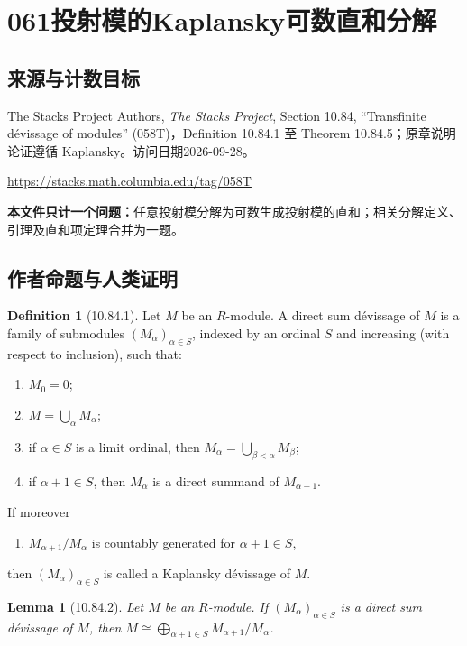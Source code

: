 \documentclass[UTF8,11pt]{ctexart}
\newtheorem*{lemma}{Lemma}
\theoremstyle{definition}
\newtheorem*{definition}{Definition}
\begin{document}
\section*{061\quad 投射模的Kaplansky可数直和分解}
\subsection*{来源与计数目标}
The Stacks Project Authors, \emph{The Stacks Project}, Section 10.84, ``Transfinite d\'evissage of modules'' (058T)，Definition 10.84.1 至 Theorem 10.84.5；原章说明论证遵循 Kaplansky。访问日期2026-09-28。
\par\url{https://stacks.math.columbia.edu/tag/058T}
\par\textbf{本文件只计一个问题：}任意投射模分解为可数生成投射模的直和；相关分解定义、引理及直和项定理合并为一题。
\subsection*{作者命题与人类证明}
\begin{definition}[10.84.1]
Let $M$ be an $R$-module. A direct sum d\'evissage of $M$ is a family of submodules $(M_\alpha)_{\alpha\in S}$, indexed by an ordinal $S$ and increasing (with respect to inclusion), such that:
\begin{enumerate}[label=(\arabic*),start=0]
\item $M_0=0$;
\item $M=\bigcup_\alpha M_\alpha$;
\item if $\alpha\in S$ is a limit ordinal, then $M_\alpha=\bigcup_{\beta<\alpha}M_\beta$;
\item if $\alpha+1\in S$, then $M_\alpha$ is a direct summand of $M_{\alpha+1}$.
\end{enumerate}
If moreover
\begin{enumerate}[label=(\arabic*),start=4]
\item $M_{\alpha+1}/M_\alpha$ is countably generated for $\alpha+1\in S$,
\end{enumerate}
then $(M_\alpha)_{\alpha\in S}$ is called a Kaplansky d\'evissage of $M$.
\end{definition}
\begin{lemma}[10.84.2]
Let $M$ be an $R$-module. If $(M_\alpha)_{\alpha\in S}$ is a direct sum d\'evissage of $M$, then $M\cong\bigoplus_{\alpha+1\in S}M_{\alpha+1}/M_\alpha$.
\end{lemma}
\end{document}
